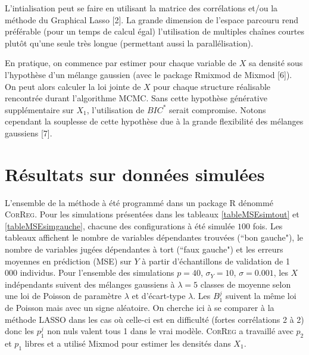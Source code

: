 \documentclass[12pt]{article}
\begin{document}
L'intialisation peut se faire en utilisant la matrice des corrélations et/ou la méthode du Graphical Lasso [2].		
La grande dimension de l'espace parcouru rend préférable  (pour un temps de calcul égal) l'utilisation de multiples chaînes courtes plutôt qu'une seule très longue (permettant aussi la parallélisation).
	
	En pratique, on commence par estimer pour chaque variable de $X$ sa densité sous l'hypothèse d'un mélange gaussien (avec le package Rmixmod de Mixmod [6]). On peut alors calculer la loi jointe de $X$ pour chaque structure réalisable rencontrée durant l'algorithme MCMC. Sans cette hypothèse générative supplémentaire sur $X_1$, l'utilisation de $BIC^*$ serait compromise. Notons cependant la souplesse de cette hypothèse due à la grande flexibilité des mélanges gaussiens [7].
\section{Résultats sur données simulées}	
L'ensemble de la méthode à été programmé dans un package R dénommé \textsc{CorReg}. Pour les simulations présentées dans les tableaux %
 \ref{tableMSEsimtout} et \ref{tableMSEsimgauche}, chacune des configurations à été simulée $100$ fois. Les tableaux affichent le nombre de variables dépendantes trouvées (``bon gauche"), le nombre de variables jugées dépendantes à tort (``faux gauche") et les erreurs moyennes en prédiction (MSE) sur $Y$ à partir d'échantillons de validation de 1 000 individus. Pour l'ensemble des simulations $p=40$, $\sigma_Y=10$, $\sigma=0.001$, les $X$ indépendants suivent des mélanges gaussiens à $\lambda=5$ classes de moyenne selon une loi de Poisson de paramètre $\lambda$ et d'écart-type $\lambda$. Les $B_{1}^j$ suivent la même loi de Poisson mais avec un signe aléatoire. On cherche ici à se comparer à la méthode LASSO dans les cas où celle-ci est en difficulté (fortes corrélations 2 à 2) donc les $p_1^j$ non nuls valent tous 1 dans le vrai modèle. \textsc{CorReg}  a  travaillé avec $p_2$ et $p_1$ libres et a utilisé Mixmod pour estimer les densités dans $X_1$. 
%
\end{document}
